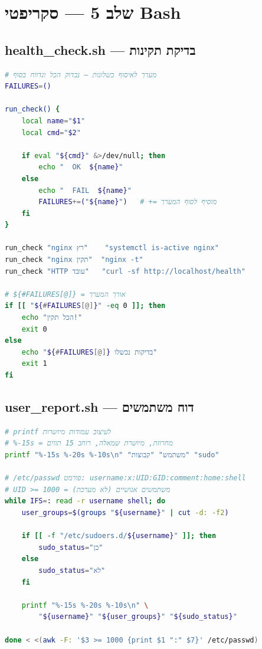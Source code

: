 \documentclass[12pt,a4paper]{article}
\begin{document}
\newpage
\section{שלב 5 — סקריפטי Bash}

\subsection{health\_check.sh — בדיקת תקינות}

\begin{lstlisting}[language=bash, caption={health\_check.sh — מערך שגיאות ופונקציית בדיקה}]
# מערך לאיסוף כשלונות — נבדוק הכל ונדווח בסוף
FAILURES=()

run_check() {
    local name="$1"
    local cmd="$2"

    if eval "${cmd}" &>/dev/null; then
        echo "  OK  ${name}"
    else
        echo "  FAIL  ${name}"
        FAILURES+=("${name}")   # += מוסיף לסוף המערך
    fi
}

run_check "nginx רץ"    "systemctl is-active nginx"
run_check "nginx תקין"  "nginx -t"
run_check "HTTP עובד"   "curl -sf http://localhost/health"

# ${#FAILURES[@]} = אורך המערך
if [[ "${#FAILURES[@]}" -eq 0 ]]; then
    echo "הכל תקין!"
    exit 0
else
    echo "${#FAILURES[@]} בדיקות נכשלו"
    exit 1
fi
\end{lstlisting}

\subsection{user\_report.sh — דוח משתמשים}

\begin{lstlisting}[language=bash, caption={user\_report.sh — שימוש ב-awk ו-printf}]
# printf לעיצוב עמודות מיושרות
# %-15s = מחרוזת, מיושרת שמאלה, רוחב 15 תווים
printf "%-15s %-20s %-10s\n" "משתמש" "קבוצות" "sudo"

# /etc/passwd פורמט: username:x:UID:GID:comment:home:shell
# UID >= 1000 = משתמשים אנושיים (לא מערכת)
while IFS=: read -r username shell; do
    user_groups=$(groups "${username}" | cut -d: -f2)

    if [[ -f "/etc/sudoers.d/${username}" ]]; then
        sudo_status="כן"
    else
        sudo_status="לא"
    fi

    printf "%-15s %-20s %-10s\n" \
        "${username}" "${user_groups}" "${sudo_status}"

done < <(awk -F: '$3 >= 1000 {print $1 ":" $7}' /etc/passwd)
\end{lstlisting}
\end{document}
